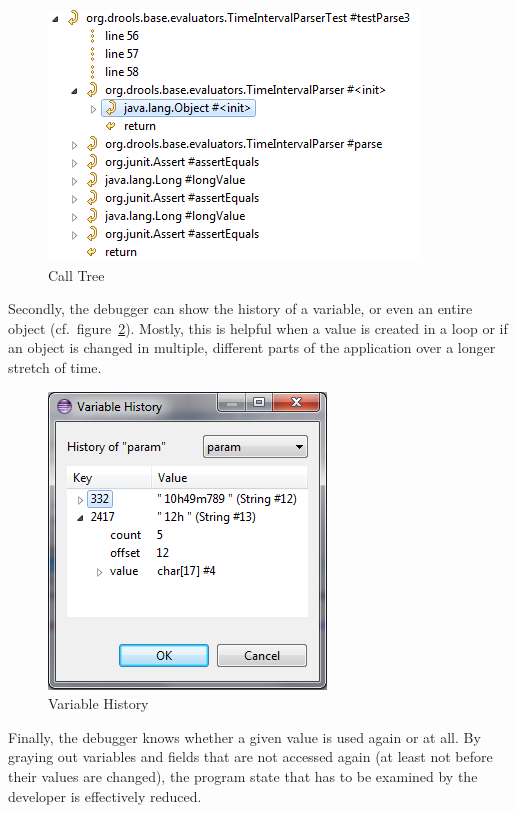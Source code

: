 \begin{figure}[ht]
\centering
\includegraphics[width=.55\textwidth]{img/tree.png}
\caption{Call Tree}
\label{fig:tree}
\end{figure}

Secondly, the debugger can show the history of a variable, or even an entire object (cf.~figure~\ref{fig:history}).
Mostly, this is helpful when a value is created in a loop or if an object is changed in multiple, different parts of the application over a longer stretch of time.

\begin{figure}[ht]
\centering
\includegraphics[width=.4\textwidth]{img/history.png}
\caption{Variable History}
\label{fig:history}
\end{figure}

Finally, the debugger knows whether a given value is used again or at all.
By graying out variables and fields that are not accessed again (at least not before their values are changed), the program state that has to be examined by the developer is effectively reduced.

%

